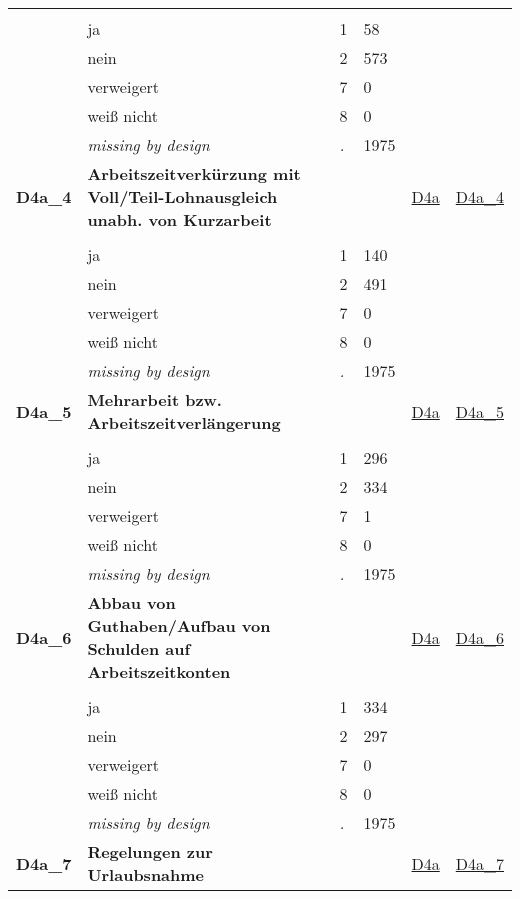 \begin{longtable}{| L{2.45cm} | L{6cm} | C{1.5cm} | R{1cm} | C{2.25cm} | C{2.25cm} |}
   &  &  &  &  &  \\ 
   & ja & 1 & 58 &  &  \\ 
   & nein & 2 & 573 &  &  \\ 
   & verweigert & 7 & 0 &  &  \\ 
   & weiß nicht & 8 & 0 &  &  \\ 
   & \textit{missing by design} & \textit{.} & 1975 &  &  \\ 
   \midrule
\textbf{D4a\_4}\label{var:D4a:4} & \textbf{Arbeitszeitverkürzung mit Voll/Teil-Lohnausgleich unabh. von Kurzarbeit} &  &  & \hyperref[D4a]{D4a} & \hyperref[var:suf:D4a:4]{D4a\_4} \\ 
   &  &  &  &  &  \\ 
   & ja & 1 & 140 &  &  \\ 
   & nein & 2 & 491 &  &  \\ 
   & verweigert & 7 & 0 &  &  \\ 
   & weiß nicht & 8 & 0 &  &  \\ 
   & \textit{missing by design} & \textit{.} & 1975 &  &  \\ 
   \midrule
\textbf{D4a\_5}\label{var:D4a:5} & \textbf{Mehrarbeit bzw. Arbeitszeitverlängerung} &  &  & \hyperref[D4a]{D4a} & \hyperref[var:suf:D4a:5]{D4a\_5} \\ 
   &  &  &  &  &  \\ 
   & ja & 1 & 296 &  &  \\ 
   & nein & 2 & 334 &  &  \\ 
   & verweigert & 7 & 1 &  &  \\ 
   & weiß nicht & 8 & 0 &  &  \\ 
   & \textit{missing by design} & \textit{.} & 1975 &  &  \\ 
   \midrule
\textbf{D4a\_6}\label{var:D4a:6} & \textbf{Abbau von Guthaben/Aufbau von Schulden auf Arbeitszeitkonten} &  &  & \hyperref[D4a]{D4a} & \hyperref[var:suf:D4a:6]{D4a\_6} \\ 
   &  &  &  &  &  \\ 
   & ja & 1 & 334 &  &  \\ 
   & nein & 2 & 297 &  &  \\ 
   & verweigert & 7 & 0 &  &  \\ 
   & weiß nicht & 8 & 0 &  &  \\ 
   & \textit{missing by design} & \textit{.} & 1975 &  &  \\ 
   \midrule
\textbf{D4a\_7}\label{var:D4a:7} & \textbf{Regelungen zur Urlaubsnahme} &  &  & \hyperref[D4a]{D4a} & \hyperref[var:suf:D4a:7]{D4a\_7} \\ 

\end{longtable}
